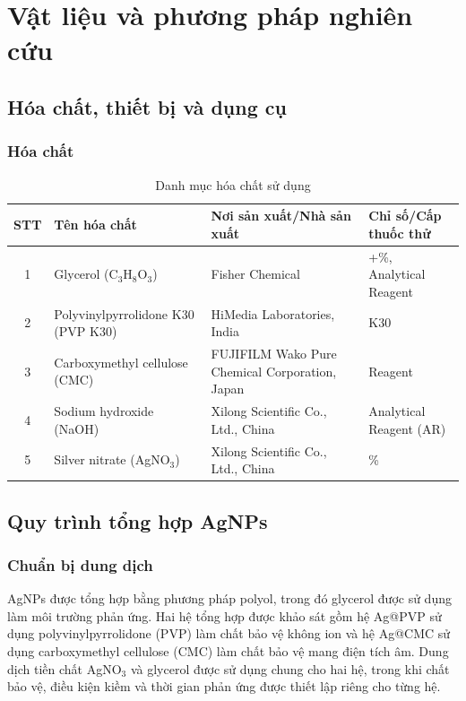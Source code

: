 \chapter{Vật liệu và phương pháp nghiên cứu}

\section{Hóa chất, thiết bị và dụng cụ}
\subsection{Hóa chất}
\begin{table}[htbp]
\centering
\small
\caption{Danh mục hóa chất sử dụng}
\label{tab:chemicals}
\begin{tabular}{@{}c>{\raggedright\arraybackslash}p{3.1cm}>{\raggedright\arraybackslash}p{5.6cm}>{\raggedright\arraybackslash}p{3.0cm}@{}}
\toprule
STT & Tên hóa chất & Nơi sản xuất/Nhà sản xuất & Chỉ số/Cấp thuốc thử \\
\midrule
1 & Glycerol (C$_3$H$_8$O$_3$) & Fisher Chemical & 99+\%, Analytical Reagent \\
2 & Polyvinyl\-pyrrolidone K30 (PVP K30) & HiMedia Laboratories, India & K30 \\
3 & Carboxymethyl cellulose (CMC) & FUJIFILM Wako Pure Chemical Corporation, Japan & Reagent \\
4 & Sodium hydroxide (NaOH) & Xilong Scientific Co., Ltd., China & Analytical Reagent (AR) \\
5 & Silver nitrate (AgNO$_3$) & Xilong Scientific Co., Ltd., China & 99\% \\
\bottomrule
\end{tabular}
\end{table}

\section{Quy trình tổng hợp AgNPs}
\subsection{Chuẩn bị dung dịch}
AgNPs được tổng hợp bằng phương pháp polyol, trong đó glycerol được sử dụng làm môi trường phản ứng.
Hai hệ tổng hợp được khảo sát gồm hệ Ag@PVP sử dụng polyvinyl\-pyrrolidone (PVP) làm chất bảo vệ không ion và hệ Ag@CMC sử dụng carboxymethyl cellulose (CMC) làm chất bảo vệ mang điện tích âm.
Dung dịch tiền chất AgNO$_3$ và glycerol được sử dụng chung cho hai hệ, trong khi chất bảo vệ, điều kiện kiềm và thời gian phản ứng được thiết lập riêng cho từng hệ.

